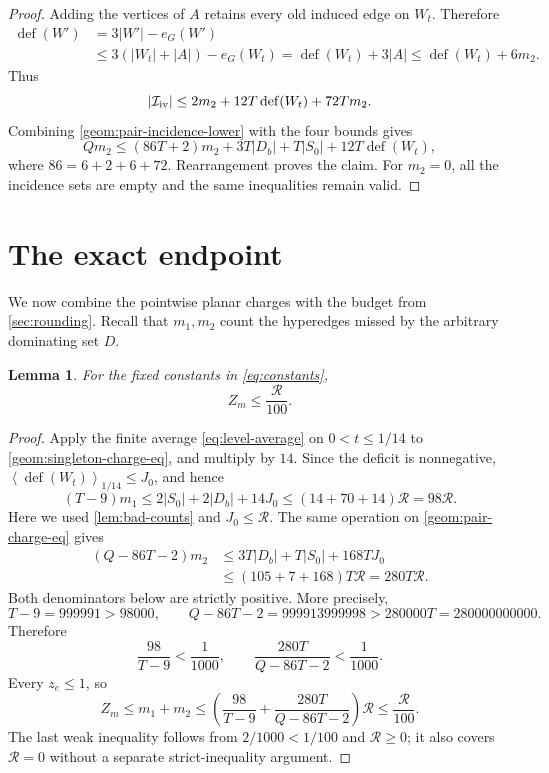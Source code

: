 \documentclass[11pt,a4paper]{article}
\newtheorem{lemma}[lemma]{Lemma}
\theoremstyle{definition}
\theoremstyle{remark}
\DeclareMathOperator{\Def}{def}
\newcommand{\budget}{\mathcal R}
\newcommand{\avg}[2]{\left\langle #1\right\rangle_{#2}}
\begin{document}
\begin{proof}
Adding the vertices of $A$ retains every old induced edge on $W_t$.
Therefore
\[
 \begin{split}
 \Def(W')&=3|W'|-e_G(W')\\
 &\leq3(|W_t|+|A|)-e_G(W_t)
 =\Def(W_t)+3|A|\leq\Def(W_t)+6m_2.
 \end{split}
\]
Thus
\begin{equation}\label{geom:pair-cat-four}
 |\mathcal I_{\rm iv}|\leq2m_2+12T\Def(W_t)+72Tm_2.
\end{equation}
Combining \eqref{geom:pair-incidence-lower} with the four bounds gives
\[
 Qm_2\leq(86T+2)m_2+3T|D_b|+T|S_0|+12T\Def(W_t),
\]
where $86=6+2+6+72$. Rearrangement proves the claim. For $m_2=0$,
all the incidence sets are empty and the same inequalities remain valid.
\end{proof}

\section{The exact endpoint}
\label{sec:endpoint}

We now combine the pointwise planar charges with the budget from
\cref{sec:rounding}. Recall that \(m_1,m_2\) count the hyperedges
missed by the arbitrary dominating set \(D\).

\begin{lemma}\label{lem:missed-budget}
For the fixed constants in \eqref{eq:constants},
\[
 Z_m\leq\frac{\budget}{100}.
\]
\end{lemma}
\begin{proof}
Apply the finite average \eqref{eq:level-average} on
\(0<t\leq1/14\) to \eqref{geom:singleton-charge-eq}, and multiply
by \(14\). Since the deficit is nonnegative,
\(\avg{\Def(W_t)}{1/14}\leq J_0\), and hence
\[
 (T-9)m_1\leq2|S_0|+2|D_b|+14J_0
 \leq(14+70+14)\budget=98\budget.
\]
Here we used \cref{lem:bad-counts} and \(J_0\leq\budget\).
The same operation on \eqref{geom:pair-charge-eq} gives
\[
 \begin{split}
 (Q-86T-2)m_2
 &\leq3T|D_b|+T|S_0|+168TJ_0\\
 &\leq(105+7+168)T\budget=280T\budget.
 \end{split}
\]
Both denominators below are strictly positive. More precisely,
\[
 T-9=999991>98000,\qquad
 Q-86T-2=999913999998>280000T=280000000000.
\]
Therefore
\[
 \frac{98}{T-9}<\frac1{1000},\qquad
 \frac{280T}{Q-86T-2}<\frac1{1000}.
\]
Every \(z_e\leq1\), so
\[
 Z_m\leq m_1+m_2
 \leq\left(\frac{98}{T-9}+
           \frac{280T}{Q-86T-2}\right)\budget
 \leq\frac{\budget}{100}.
\]
The last weak inequality follows from
\(2/1000<1/100\) and \(\budget\geq0\); it also covers
\(\budget=0\) without a separate strict-inequality argument.
\end{proof}
\end{document}
